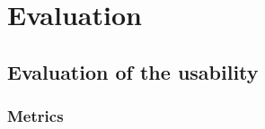 \chapter{Evaluation}\label{ch:evaluation}

\section{Evaluation of the usability}\label{sec:evaluation-usability}

\subsection{Metrics}\label{subsec:evaluation-metrics}